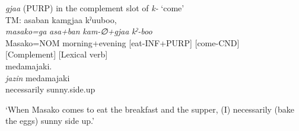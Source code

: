 \begin{exe}
\begin{xlist}
\ex\label{ex:4.34d}\textit{gjaa} (PURP) in the complement slot of \textit{k-} ‘come’\hfill\relax[Co: 101023\_01.txt]\\
 {TM:}  {{\textbar}asaban{\textbar}} {kamgjaa} {kˀuuboo,}\\ 
  {\itshape masako=ga} {\itshape asa+ban} {\itshape kam-∅+gjaa} {\itshape kˀ-boo}\\ 
  {Masako=NOM} {morning+evening} {[eat-INF+PURP]} {[come-CND]}\\ 
  {} {} {[Complement]} {[Lexical verb]}\\
      {{\textbar}medamajaki{\textbar}.}\\
{\itshape jazin} {medamajaki}\\
{necessarily} {sunny.side.up}\\
  \glt{} \parbox{\linewidth-\widthof{TM:}}{‘When Masako comes to eat the breakfast and the supper, (I) necessarily (bake the eggs) sunny side up.’}
\z
\z
% 
% 

\end{xlist}
\end{exe}
